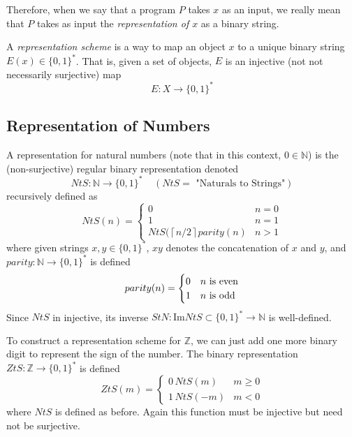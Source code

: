 \documentclass{article}
\begin{document}
  Therefore, when we say that a program $P$ takes $x$ as an input, we really mean that $P$ takes as input the \textit{representation of $x$} as a binary string.  

  \begin{definition}
  A \textit{representation scheme} is a way to map an object $x$ to a unique binary string $E(x) \in \{0,1\}^*$. That is, given a set of objects, $E$ is an injective (not not necessarily surjective) map
  \[E: X \longrightarrow \{0,1\}^*\]
  \end{definition}

  \subsection{Representation of Numbers}
  \begin{definition}
  A representation for natural numbers (note that in this context, $0 \in \mathbb{N}$) is the (non-surjective) regular binary representation denoted
  \[NtS: \mathbb{N} \longrightarrow \{0,1\}^* \;\;\;\; (NtS= \text{ "Naturals to Strings"})\]
  recursively defined as 
  \[NtS(n) = \begin{cases}
  0 & n = 0 \\
  1 & n = 1 \\
  NtS(\left \lceil{n/2}\right \rceil parity(n) & n > 1 
  \end{cases}\]
  where given strings $x, y \in \{0,1\}^*$, $xy$ denotes the concatenation of $x$ and $y$, and $parity: \mathbb{N} \longrightarrow \{0,1\}^*$ is defined 
  \[parity(n) = \begin{cases}
  0 & n $\text{ is even}$ \\
  1 & n $\text{ is odd}$
  \end{cases}\]
  Since $NtS$ in injective, its inverse $StN: \mathrm{Im}{NtS} \subset \{0,1\}^* \longrightarrow \mathbb{N}$ is well-defined. 
  \end{definition}

  \begin{definition}
  To construct a representation scheme for $\mathbb{Z}$, we can just add one more binary digit to represent the sign of the number. The binary representation $ZtS: \mathbb{Z} \longrightarrow \{0, 1\}^*$ is defined
  \[ZtS(m) = \begin{cases}
  0\, NtS(m) & m \geq 0 \\
  1 \, NtS(-m) & m < 0
  \end{cases}\]
  where $NtS$ is defined as before. Again this function must be injective but need not be surjective. 
  \end{definition}
\end{document}
